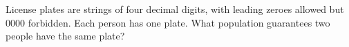License plates are strings of four decimal digits, with leading zeroes allowed but $0000$ forbidden. Each person has one plate. What population guarantees two people have the same plate?
